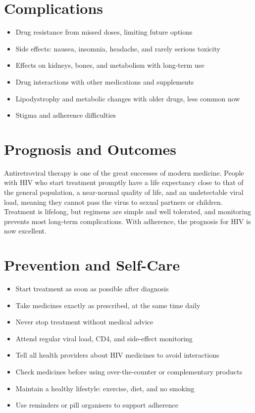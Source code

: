 \section*{Complications}
\begin{itemize}
    \item Drug resistance from missed doses, limiting future options
    \item Side effects: nausea, insomnia, headache, and rarely serious toxicity
    \item Effects on kidneys, bones, and metabolism with long-term use
    \item Drug interactions with other medications and supplements
    \item Lipodystrophy and metabolic changes with older drugs, less common now
    \item Stigma and adherence difficulties
\end{itemize}

\section*{Prognosis and Outcomes}
Antiretroviral therapy is one of the great successes of modern medicine. People with HIV who start treatment promptly have a life expectancy close to that of the general population, a near-normal quality of life, and an undetectable viral load, meaning they cannot pass the virus to sexual partners or children. Treatment is lifelong, but regimens are simple and well tolerated, and monitoring prevents most long-term complications. With adherence, the prognosis for HIV is now excellent.

\section*{Prevention and Self-Care}
\begin{itemize}
    \item Start treatment as soon as possible after diagnosis
    \item Take medicines exactly as prescribed, at the same time daily
    \item Never stop treatment without medical advice
    \item Attend regular viral load, CD4, and side-effect monitoring
    \item Tell all health providers about HIV medicines to avoid interactions
    \item Check medicines before using over-the-counter or complementary products
    \item Maintain a healthy lifestyle: exercise, diet, and no smoking
    \item Use reminders or pill organisers to support adherence
\end{itemize}

